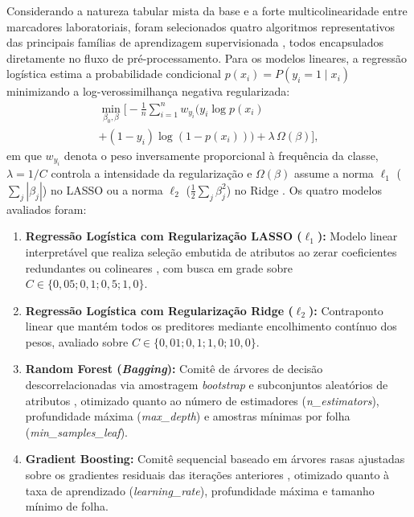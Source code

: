 \documentclass[conference]{IEEEtran}
\begin{document}
Considerando a natureza tabular mista da base e a forte multicolinearidade entre marcadores laboratoriais, foram selecionados quatro algoritmos representativos das principais famílias de aprendizagem supervisionada \cite{b4}, todos encapsulados diretamente no fluxo de pré-processamento. Para os modelos lineares, a regressão logística estima a probabilidade condicional $p(x_i) = P(y_i = 1 \mid x_i)$ minimizando a log-verossimilhança negativa regularizada:
\begin{multline}
\min_{\beta_0, \beta} \Bigg[ -\frac{1}{n}\sum_{i=1}^{n} w_{y_i} \Big( y_i \log p(x_i) \\
+ (1 - y_i)\log(1 - p(x_i)) \Big) + \lambda \, \Omega(\beta) \Bigg],
\label{eq:logreg_reg}
\end{multline}
em que $w_{y_i}$ denota o peso inversamente proporcional à frequência da classe, $\lambda = 1/C$ controla a intensidade da regularização e $\Omega(\beta)$ assume a norma $\ell_1$ ($\sum_j |\beta_j|$) no LASSO ou a norma $\ell_2$ ($\frac{1}{2}\sum_j \beta_j^2$) no Ridge \cite{b4}. Os quatro modelos avaliados foram:
\begin{enumerate}
    \item \textbf{Regressão Logística com Regularização LASSO ($\ell_1$):} Modelo linear interpretável que realiza seleção embutida de atributos ao zerar coeficientes redundantes ou colineares \cite{b5}, com busca em grade sobre $C \in \{0,05; 0,1; 0,5; 1,0\}$.
    \item \textbf{Regressão Logística com Regularização Ridge ($\ell_2$):} Contraponto linear que mantém todos os preditores mediante encolhimento contínuo dos pesos, avaliado sobre $C \in \{0,01; 0,1; 1,0; 10,0\}$.
    \item \textbf{Random Forest (\textit{Bagging}):} Comitê de árvores de decisão descorrelacionadas via amostragem \textit{bootstrap} e subconjuntos aleatórios de atributos \cite{b6}, otimizado quanto ao número de estimadores (\textit{n\allowbreak\_estimators}), profundidade máxima (\textit{max\allowbreak\_depth}) e amostras mínimas por folha (\textit{min\allowbreak\_samples\allowbreak\_leaf}).
    \item \textbf{Gradient Boosting:} Comitê sequencial baseado em árvores rasas ajustadas sobre os gradientes residuais das iterações anteriores \cite{b7}, otimizado quanto à taxa de aprendizado (\textit{learning\_rate}), profundidade máxima e tamanho mínimo de folha.
\end{enumerate}
\end{document}
